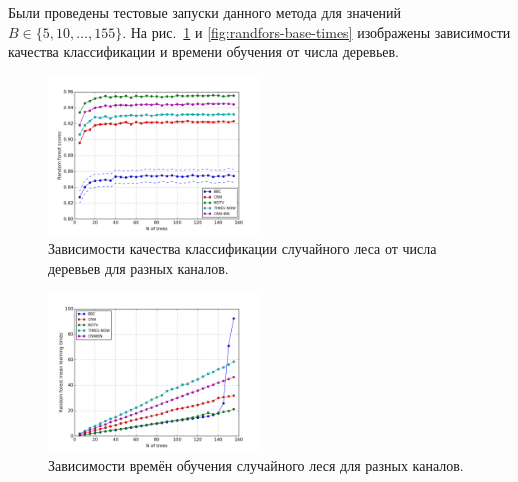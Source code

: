 Были проведены тестовые запуски данного метода для значений \(B\in\{5,10,\dotsc,155\}\). На рис.~\ref{fig:randfor-base-scores} и \ref{fig:randfors-base-times} изображены зависимости качества классификации и времени обучения от числа деревьев.
\begin{figure}[h!]
    \centering
    \includegraphics[width=0.5\textwidth]{images/randfor-scores.png}
    \caption{Зависимости качества классификации случайного леса от числа деревьев для разных каналов.}
    \label{fig:randfor-base-scores}
\end{figure}
\begin{figure}[h!]
    \centering
    \includegraphics[width=0.5\textwidth]{images/randfor-times.png}
    \caption{Зависимости времён обучения случайного леся для разных каналов.}
    \label{fig:randfor-base-times}
\end{figure}

